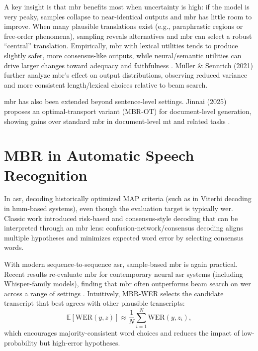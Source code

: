 A key insight is that \gls{mbr} benefits most when uncertainty is high: if the model is very peaky, samples collapse to near-identical outputs and \gls{mbr} has little room to improve. When many plausible translations exist (e.g., paraphrastic regions or free-order phenomena), sampling reveals alternatives and \gls{mbr} can select a robust “central” translation. Empirically, \gls{mbr} with lexical utilities tends to produce slightly safer, more consensus-like outputs, while neural/semantic utilities can drive larger changes toward adequacy and faithfulness \cite{mueller2021understanding_mbr,mbr_neural_metrics_2021}. Müller \& Sennrich (2021) \cite{mueller2021understanding_mbr} further analyze \gls{mbr}’s effect on output distributions, observing reduced variance and more consistent length/lexical choices relative to beam search.

\gls{mbr} has also been extended beyond sentence-level settings. Jinnai (2025) proposes an optimal-transport variant (MBR-OT) for document-level generation, showing gains over standard \gls{mbr} in document-level \gls{mt} and related tasks \cite{jinnai-2025-document}.



\section{MBR in Automatic Speech Recognition}

In \gls{asr}, decoding historically optimized MAP criteria (such as in Viterbi decoding in \gls{hmm}-based systems), even though the evaluation target is typically \gls{wer}. Classic work introduced risk-based and consensus-style decoding that can be interpreted through an \gls{mbr} lens: confusion-network/consensus decoding aligns multiple hypotheses and minimizes expected word error by selecting consensus words\cite{mangu2000confusion}.


With modern sequence-to-sequence \gls{asr}, sample-based \gls{mbr} is again practical. Recent results re-evaluate \gls{mbr} for contemporary neural \gls{asr} systems (including Whisper-family models), finding that \gls{mbr} often outperforms beam search on \gls{wer} across a range of settings \cite{jinnai2025mbr_asr,radford2022whisper}. Intuitively, \textsc{MBR-WER} selects the candidate transcript that best agrees with other plausible transcripts:
\[
\mathbb{E}[\mathrm{WER}(y, z)] \approx \frac{1}{N}\sum_{i=1}^N \mathrm{WER}(y, z_i),
\]
which encourages majority-consistent word choices and reduces the impact of low-probability but high-error hypotheses.

